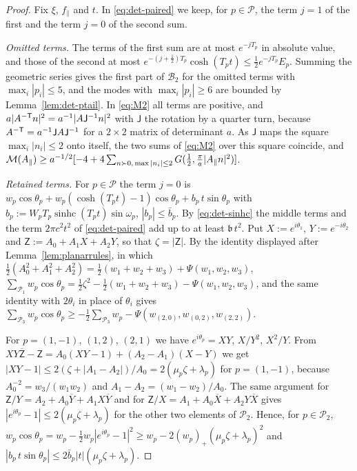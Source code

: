 \begin{proof}
Fix $\xi$, $f_\parallel$ and $t$. In \eqref{eq:det-paired} we keep, for $p\in\mathcal P$, the term $j=1$ of the first and the term
$j=0$ of the second sum.

\emph{Omitted terms.} The terms of the first sum are at most $e^{-jT_p}$ in absolute value, and those of the second at most
$e^{-(j+\frac12)T_p}\cosh(T_pt)\le\frac12e^{-jT_p}E_p$. Summing the geometric series gives the first part of $\mathcal B_2$ for the
omitted terms with $\max_i|p_i|\le5$, and the modes with $\max_i|p_i|\ge6$ are bounded by Lemma~\ref{lem:det-ptail}. In
\eqref{eq:M2} all terms are positive, and $a|A^{-\mathsf T}n|^2=a^{-1}|A\mathsf J^{-1}n|^2$ with $\mathsf J$ the rotation by a quarter turn,
because $A^{-\mathsf T}=a^{-1}\mathsf JA\mathsf J^{-1}$ for a $2\times2$ matrix of determinant $a$. As $\mathsf J$ maps the square
$\max_i|n_i|\le2$ onto itself, the two sums of \eqref{eq:M2} over this square coincide, and
$\mathcal M(A_\parallel)\ge a^{-1/2}[-4+4\sum_{n\succ0,\,\max|n_i|\le2}G(\frac12,\frac\pi a|A_\parallel n|^2)]$.

\emph{Retained terms.} For $p\in\mathcal P$ the term $j=0$ is
$w_p\cos\theta_p+w_p(\cosh(T_pt)-1)\cos\theta_p+b_p\,t\sin\theta_p$ with $b_p:=W_pT_p\operatorname{sinhc}(T_pt)\sin\omega_p$,
$|b_p|\le\bar b_p$. By \eqref{eq:det-sinhc} the middle terms and the term $2\pi c^2t^2$ of \eqref{eq:det-paired} add up to at least
$\mathfrak b\,t^2$. Put $X:=e^{i\theta_1}$, $Y:=e^{-i\theta_2}$ and $\mathsf Z:=A_0+A_1X+A_2Y$, so that $\zeta=|\mathsf Z|$. By the
identity displayed after Lemma~\ref{lem:planarrules}, in which $\frac12(A_0^2+A_1^2+A_2^2)=\frac12(w_1+w_2+w_3)+\Psi(w_1,w_2,w_3)$,
$\sum_{\mathcal P_1}w_p\cos\theta_p=\frac12\zeta^2-\frac12(w_1+w_2+w_3)-\Psi(w_1,w_2,w_3)$, and the same identity with $2\theta_i$ in
place of $\theta_i$ gives $\sum_{\mathcal P_3}w_p\cos\theta_p\ge-\frac12\sum_{\mathcal P_3}w_p-\Psi(w_{(2,0)},w_{(0,2)},w_{(2,2)})$.

For $p=(1,-1)$, $(1,2)$, $(2,1)$ we have $e^{i\theta_p}=XY$, $X/Y^2$, $X^2/Y$. From
$XY\overline{\mathsf Z}-\mathsf Z=A_0(XY-1)+(A_2-A_1)(X-Y)$ we get $|XY-1|\le2(\zeta+|A_1-A_2|)/A_0=2(\mu_p\zeta+\lambda_p)$ for
$p=(1,-1)$, because $A_0^{-2}=w_3/(w_1w_2)$ and $A_1-A_2=(w_1-w_2)/A_0$. The same argument for
$\mathsf Z/Y=A_2+A_0\overline Y+A_1X\overline Y$ and for $\mathsf Z/X=A_1+A_0\overline X+A_2Y\overline X$ gives
$|e^{i\theta_p}-1|\le2(\mu_p\zeta+\lambda_p)$ for the other two elements of $\mathcal P_2$. Hence, for $p\in\mathcal P_2$,
$w_p\cos\theta_p=w_p-\frac12w_p|e^{i\theta_p}-1|^2\ge w_p-2(w_p)_+(\mu_p\zeta+\lambda_p)^2$ and
$|b_p\,t\sin\theta_p|\le2\bar b_p|t|(\mu_p\zeta+\lambda_p)$.


\end{proof}
